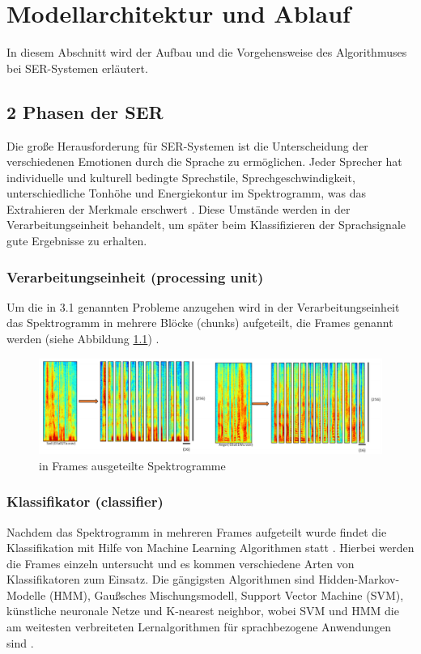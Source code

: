 \chapter{Modellarchitektur und Ablauf}

In diesem Abschnitt wird der Aufbau und die Vorgehensweise des Algorithmuses bei SER-Systemen erläutert.


\section{2 Phasen der SER}

Die große Herausforderung für SER-Systemen ist die Unterscheidung der verschiedenen Emotionen durch die Sprache zu ermöglichen. Jeder Sprecher hat individuelle und kulturell bedingte Sprechstile, Sprechgeschwindigkeit, unterschiedliche Tonhöhe und Energiekontur im Spektrogramm, was das Extrahieren der Merkmale erschwert \cite{badshah2019deep}. Diese Umstände werden in der Verarbeitungseinheit behandelt, um später beim Klassifizieren der Sprachsignale gute Ergebnisse zu erhalten. 
\subsection{Verarbeitungseinheit (processing unit)}
Um die in 3.1 genannten Probleme anzugehen wird in der Verarbeitungseinheit das Spektrogramm in mehrere Blöcke (chunks) aufgeteilt, die Frames genannt werden (siehe Abbildung \ref{frames}) \cite{badshah2019deep}.
\begin{figure}[ht]
	\centering
	\includegraphics[width=1\textwidth]{images/frames}
	\caption{\label{frames} in Frames ausgeteilte Spektrogramme \cite{badshah2019deep}}
\end{figure}
\subsection{Klassifikator (classifier)}
Nachdem das Spektrogramm in mehreren Frames aufgeteilt wurde findet die Klassifikation mit Hilfe von Machine Learning Algorithmen statt \cite{badshah2019deep}. Hierbei werden die Frames einzeln untersucht und es kommen verschiedene Arten von Klassifikatoren zum Einsatz. Die gängigsten Algorithmen sind Hidden-Markov-Modelle (HMM), Gaußsches Mischungsmodell, Support Vector Machine (SVM), künstliche neuronale Netze und K-nearest neighbor, wobei SVM und HMM die am weitesten verbreiteten Lernalgorithmen für sprachbezogene Anwendungen sind \cite{badshah2019deep}.

